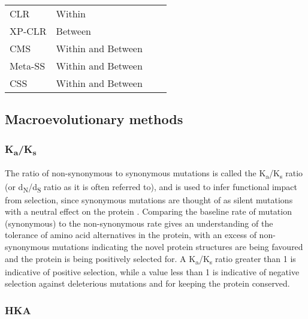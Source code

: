 \documentclass[]{report}
\begin{document}
\begin{table}
\begin{tabular}[t]{l>{\raggedright\arraybackslash}p{10em}ll}
\hspace{1em}CLR & Within &  & \citet{Kim2002}\\
\hspace{1em}XP-CLR & Between &  & \citet{Chen2010}\\
\hspace{1em}CMS & Within and Between &  & \citet{Grossman2010}\\
\hspace{1em}Meta-SS & Within and Between &  & \citet{Utsunomiya2015}\\
\hspace{1em}CSS & Within and Between &  & \citet{Randhawa2014}\\
\bottomrule
\end{tabular}
\end{table}

\subsection{Macroevolutionary methods}\label{macroevolutionary-methods}

\subsubsection{\texorpdfstring{K\textsubscript{a}/K\textsubscript{s}}{Ka/Ks}}\label{kaks}

The ratio of non-synonymous to synonymous mutations is called the
K\textsubscript{a}/K\textsubscript{s} ratio (or
d\textsubscript{N}/d\textsubscript{S} ratio as it is often referred to),
and is used to infer functional impact from selection, since synonymous
mutations are thought of as silent mutations with a neutral effect on
the protein \citep{Hughes1988}. Comparing the baseline rate of mutation
(synonymous) to the non-synonymous rate gives an understanding of the
tolerance of amino acid alternatives in the protein, with an excess of
non-synonymous mutations indicating the novel protein structures are
being favoured and the protein is being positively selected for. A
K\textsubscript{a}/K\textsubscript{s} ratio greater than 1 is indicative
of positive selection, while a value less than 1 is indicative of
negative selection against deleterious mutations and for keeping the
protein conserved.

\subsubsection{HKA}\label{hka}
\end{document}
